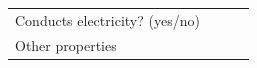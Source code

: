 \begin{enumerate}[noitemsep, label=\textbf{\arabic*}. ]
{\begin{tabular}[t]{|l|l|l|l|}
     \tabularnewline\cline{1-1}\cline{2-2}\cline{3-3}\cline{4-4}
    
    
        Conducts electricity? (yes/no) &
    
    
         &
    
    
         &
    
    
     \tabularnewline\cline{1-1}\cline{2-2}\cline{3-3}\cline{4-4}
    
    
        Other properties &
    
    
         &
    
    
         &
    
    

\end{tabular}}
\end{enumerate}
